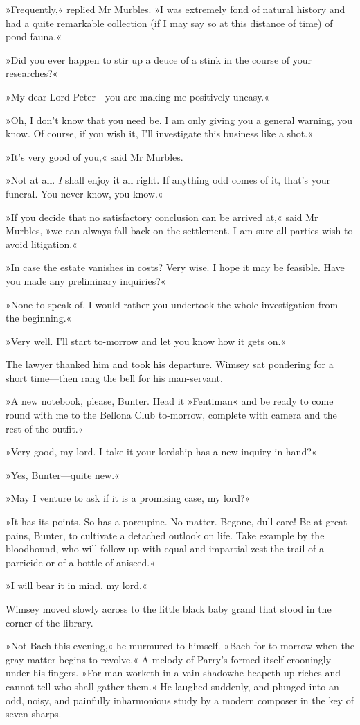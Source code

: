 »Frequently,« replied Mr Murbles. »I was extremely fond of natural history and had a quite remarkable collection (if I may say so at this distance of time) of pond fauna.«

»Did you ever happen to stir up a deuce of a stink in the course of your researches?«

»My dear Lord Peter—you are making me positively uneasy.«

»Oh, I don't know that you need be. I am only giving you a general warning, you know. Of course, if you wish it, I'll investigate this business like a shot.«

»It's very good of you,« said Mr Murbles.

»Not at all. \textit{I} shall enjoy it all right. If anything odd comes of it, that's your funeral. You never know, you know.«

»If you decide that no satisfactory conclusion can be arrived at,« said Mr Murbles, »we can always fall back on the settlement. I am sure all parties wish to avoid litigation.«

»In case the estate vanishes in costs? Very wise. I hope it may be feasible. Have you made any preliminary inquiries?«

»None to speak of. I would rather you undertook the whole investigation from the beginning.«

»Very well. I'll start to-morrow and let you know how it gets on.«

The lawyer thanked him and took his departure. Wimsey sat pondering for a short time—then rang the bell for his man-servant.

»A new notebook, please, Bunter. Head it »Fentiman« and be ready to come round with me to the Bellona Club to-morrow, complete with camera and the rest of the outfit.«

»Very good, my lord. I take it your lordship has a new inquiry in hand?«

»Yes, Bunter—quite new.«

»May I venture to ask if it is a promising case, my lord?«

»It has its points. So has a porcupine. No matter. Begone, dull care! Be at great pains, Bunter, to cultivate a detached outlook on life. Take example by the bloodhound, who will follow up with equal and impartial zest the trail of a parricide or of a bottle of aniseed.«

»I will bear it in mind, my lord.«

Wimsey moved slowly across to the little black baby grand that stood in the corner of the library.

»Not Bach this evening,« he murmured to himself. »Bach for to-morrow when the gray matter begins to revolve.« A melody of Parry's formed itself crooningly under his fingers. »For man worketh in a vain shadow\textellipsis  he heapeth up riches and cannot tell who shall gather them.« He laughed suddenly, and plunged into an odd, noisy, and painfully inharmonious study by a modern composer in the key of seven sharps.